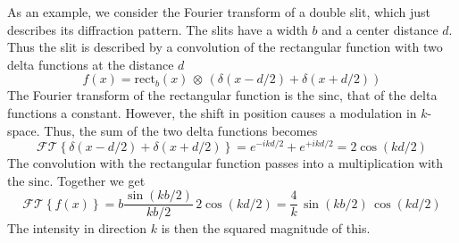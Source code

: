 As an example, we consider the Fourier transform of a double slit, which just describes its diffraction pattern. The slits have a width $b$ and a center distance $d$. Thus the slit is described by a convolution of the rectangular function with two delta functions at the distance $d$
\begin{equation}
f(x) = \text{rect} _b (x) \, \otimes \, \left( \delta (x - d/2) + \delta (x + d/2) \right)
\end{equation}
The Fourier transform of the rectangular function is the $\text{sinc}$, that of the delta functions a constant. However, the shift in position causes a modulation in $k$-space. Thus, the sum of the two delta functions becomes 
\begin{equation}
\mathcal{FT}\left\{ \delta (x - d/2) + \delta (x + d/2) \right\} =
e^{-i k d/2} + e^{+i k d/2} = 2 \cos ( k d/2)
\end{equation}
The convolution with the rectangular function passes into a multiplication with the $\text{sinc}$. Together we get
\begin{equation}
\mathcal{FT}\left\{ f(x) \right\} = b \frac{\sin (k b/2) }{kb/2} \, 2 \cos ( k d/2) = \frac{4}{k} \, \sin (k b/2) \, \cos ( k d/2) 
\end{equation}
The intensity in direction $k$ is then the squared magnitude  of this.

\printbibliography[segment=\therefsegment,heading=subbibliography]
